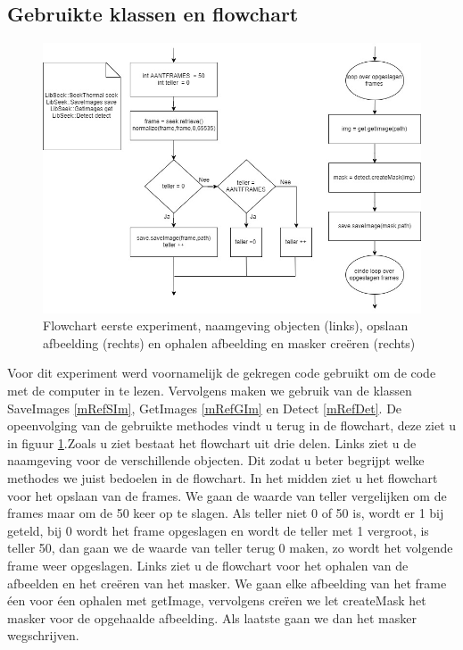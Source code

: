 \subsection{Gebruikte klassen en flowchart}
\label{ERefOBF}
\begin{figure}[hbp]
	\includegraphics[scale=0.45]{FlowChart_EersteExperiment}
	\caption{Flowchart eerste experiment, naamgeving objecten (links), opslaan afbeelding (rechts) en ophalen afbeelding en masker cre\"eren (rechts)}
	\label{imgFCEEx}
\end{figure}
Voor dit experiment werd voornamelijk de gekregen code gebruikt om de code met de computer in te lezen. Vervolgens maken we gebruik van de klassen SaveImages \ref{mRefSIm}, GetImages \ref{mRefGIm} en Detect \ref{mRefDet}. De opeenvolging van de gebruikte methodes vindt u terug in de flowchart, deze ziet u in figuur \ref{imgFCEEx}.Zoals u ziet bestaat het flowchart uit drie delen. Links ziet u de naamgeving voor de verschillende objecten. Dit zodat u beter begrijpt welke methodes we juist bedoelen in de flowchart. In het midden ziet u het flowchart voor het opslaan van de frames. We gaan de waarde van teller vergelijken om de frames maar om de 50 keer op te slagen. Als teller niet 0 of 50 is, wordt er 1 bij geteld, bij 0 wordt het frame opgeslagen en wordt de teller met 1 vergroot, is teller 50, dan gaan we de waarde van teller terug 0 maken, zo wordt het volgende frame weer opgeslagen. Links ziet u de flowchart voor het ophalen van de afbeelden en het cre\"eren van het masker. We gaan elke afbeelding van het frame \'{ee}n voor \'{ee}n ophalen met getImage, vervolgens cre\"ren we let createMask het masker voor de opgehaalde afbeelding. Als laatste gaan we dan het masker wegschrijven.


